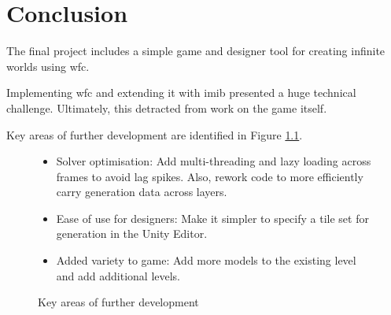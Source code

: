 \chapter{Conclusion}
The final project includes a simple game and designer tool for creating infinite worlds using \acrlong{wfc}.

Implementing \acrlong{wfc} and extending it with \acrlong{imib} presented a huge technical challenge. Ultimately, this detracted from work on the game itself.

Key areas of further development are identified in Figure \ref{fig:futureGoals}.

\begin{figure}[H]
    \begin{framed}
        \begin{itemize}
            \item Solver optimisation: Add multi-threading and lazy loading across frames to avoid lag spikes. Also, rework code to more efficiently carry generation data across layers.
            \item Ease of use for designers: Make it simpler to specify a tile set for generation in the Unity Editor.
            \item Added variety to game: Add more models to the existing level and add additional levels.
        \end{itemize}
    \end{framed}
    \caption{Key areas of further development}
    \label{fig:futureGoals}
\end{figure}